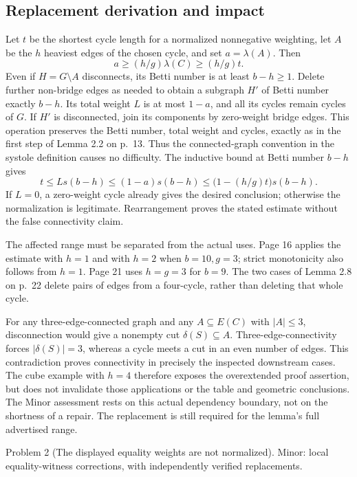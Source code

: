 \documentclass[10pt]{article}
\begin{document}
\subsection*{Replacement derivation and impact}
Let \(t\) be the shortest cycle length for a normalized nonnegative weighting, let \(A\) be the \(h\) heaviest edges of the chosen cycle, and set \(a=\lambda(A)\). Then \[a\geq (h/g)\lambda(C)\geq (h/g)t.\] Even if \(H=G\setminus A\) disconnects, its Betti number is at least \(b-h\geq1\). Delete further non-bridge edges as needed to obtain a subgraph \(H'\) of Betti number exactly \(b-h\). Its total weight \(L\) is at most \(1-a\), and all its cycles remain cycles of \(G\). If \(H'\) is disconnected, join its components by zero-weight bridge edges. This operation preserves the Betti number, total weight and cycles, exactly as in the first step of Lemma 2.2 on p. 13. Thus the connected-graph convention in the systole definition causes no difficulty. The inductive bound at Betti number \(b-h\) gives \[t\leq Ls(b-h)\leq(1-a)s(b-h)
       \leq \bigl(1-(h/g)t\bigr)s(b-h).\] If \(L=0\), a zero-weight cycle already gives the desired conclusion; otherwise the normalization is legitimate. Rearrangement proves the stated estimate without the false connectivity claim.\par
The affected range must be separated from the actual uses. Page 16 applies the estimate with \(h=1\) and with \(h=2\) when \(b=10,g=3\); strict monotonicity also follows from \(h=1\). Page 21 uses \(h=g=3\) for \(b=9\). The two cases of Lemma 2.8 on p. 22 delete pairs of edges from a four-cycle, rather than deleting that whole cycle.\par
For any three-edge-connected graph and any \(A\subseteq E(C)\) with \(|A|\leq3\), disconnection would give a nonempty cut \(\delta(S)\subseteq A\). Three-edge-connectivity forces \(|\delta(S)|=3\), whereas a cycle meets a cut in an even number of edges. This contradiction proves connectivity in precisely the inspected downstream cases. The cube example with \(h=4\) therefore exposes the overextended proof assertion, but does not invalidate those applications or the table and geometric conclusions. The Minor assessment rests on this actual dependency boundary, not on the shortness of a repair. The replacement is still required for the lemma’s full advertised range.\par
Problem 2 (The displayed equality weights are not normalized).  Minor: local equality-witness corrections, with independently verified replacements.\par
\end{document}
